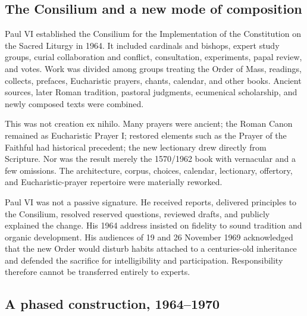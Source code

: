 \subsection{The Consilium and a new mode of composition}

Paul VI established the Consilium for the Implementation of the Constitution on the Sacred Liturgy in 1964. It included cardinals and bishops, expert study groups, curial collaboration and conflict, consultation, experiments, papal review, and votes. Work was divided among groups treating the Order of Mass, readings, collects, prefaces, Eucharistic prayers, chants, calendar, and other books. Ancient sources, later Roman tradition, pastoral judgments, ecumenical scholarship, and newly composed texts were combined.

This was not creation ex nihilo. Many prayers were ancient; the Roman Canon remained as Eucharistic Prayer I; restored elements such as the Prayer of the Faithful had historical precedent; the new lectionary drew directly from Scripture. Nor was the result merely the 1570/1962 book with vernacular and a few omissions. The architecture, corpus, choices, calendar, lectionary, offertory, and Eucharistic-prayer repertoire were materially reworked.

Paul VI was not a passive signature. He received reports, delivered principles to the Consilium, resolved reserved questions, reviewed drafts, and publicly explained the change. His 1964 address insisted on fidelity to sound tradition and organic development. His audiences of 19 and 26 November 1969 acknowledged that the new Order would disturb habits attached to a centuries-old inheritance and defended the sacrifice for intelligibility and participation. Responsibility therefore cannot be transferred entirely to experts.

\subsection{A phased construction, 1964--1970}

